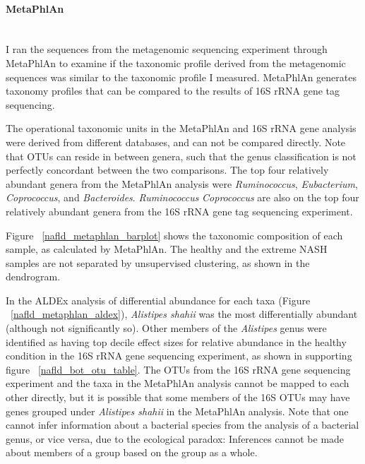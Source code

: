 \FloatBarrier

\paragraph{MetaPhlAn}\mbox{}\\
I ran the sequences from the metagenomic sequencing experiment through MetaPhlAn to examine if the taxonomic profile derived from the metagenomic sequences was similar to the taxonomic profile I measured. MetaPhlAn generates taxonomy profiles that can be compared to the results of 16S rRNA gene tag sequencing.

The operational taxonomic units in the MetaPhlAn and 16S rRNA gene analysis were derived from different databases, and can not be compared directly. Note that OTUs can reside in between genera, such that the genus classification is not perfectly concordant between the two comparisons. The top four relatively abundant genera from the MetaPhlAn analysis were \textit{Ruminococcus}, \textit{Eubacterium}, \textit{Coprococcus}, and \textit{Bacteroides}. \textit{Ruminococcus} \textit{Coprococcus} are also on the top four relatively abundant genera from the 16S rRNA gene tag sequencing experiment.

Figure ~\ref{nafld_metaphlan_barplot} shows the taxonomic composition of each sample, as calculated by MetaPhlAn. The healthy and the extreme NASH samples are not separated by unsupervised clustering, as shown in the dendrogram.

In the ALDEx analysis of differential abundance for each taxa (Figure ~\ref{nafld_metaphlan_aldex}), \textit{Alistipes shahii} was the most differentially abundant (although not significantly so). Other members of the \textit{Alistipes} genus were identified as having top decile effect sizes for relative abundance in the healthy condition in the 16S rRNA gene sequencing experiment, as shown in supporting figure ~\ref{nafld_bot_otu_table}. The OTUs from the 16S rRNA gene sequencing experiment and the taxa in the MetaPhlAn analysis cannot be mapped to each other directly, but it is possible that some members of the 16S OTUs may have genes grouped under \textit{Alistipes shahii} in the MetaPhlAn analysis. Note that one cannot infer information about a bacterial species from the analysis of a bacterial genus, or vice versa, due to the ecological paradox: Inferences cannot be made about members of a group based on the group as a whole.


